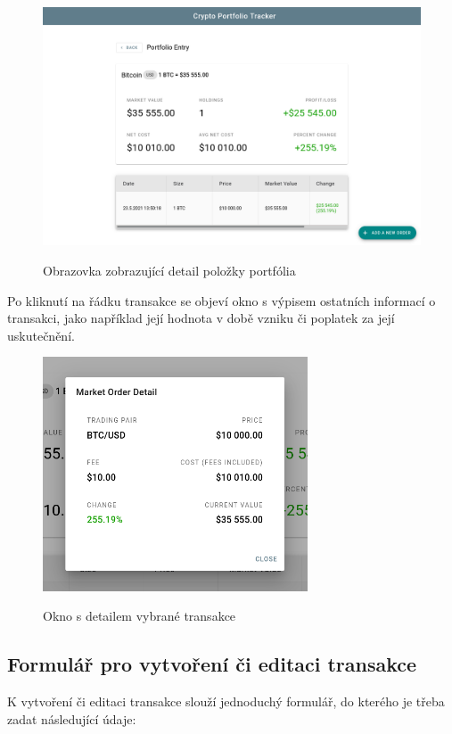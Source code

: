\documentclass[12pt, a4paper]{article}
\begin{document}
    \begin{figure}[!ht]
        \centering
        {\includegraphics[width=\textwidth]{img/cpt-screenshots/portfolio-entry-detail.png}}
        \caption{Obrazovka zobrazující detail položky portfólia}
        \label{fig:entry-detail}
    \end{figure}
    
    Po kliknutí na řádku transakce se objeví okno s výpisem ostatních informací o transakci, jako například její hodnota
    v době vzniku či poplatek za její uskutečnění.
    
    \begin{figure}[!ht]
        \centering
        {\includegraphics[width=0.7\textwidth]{img/cpt-screenshots/portfolio-order-detail.png}}
        \caption{Okno s detailem vybrané transakce}
        \label{fig:transaction-detail}
    \end{figure}

    \newpage
    \subsection{Formulář pro vytvoření či editaci transakce}
    K vytvoření či editaci transakce slouží jednoduchý formulář, do kterého je třeba zadat následující údaje:
    
\end{document}
